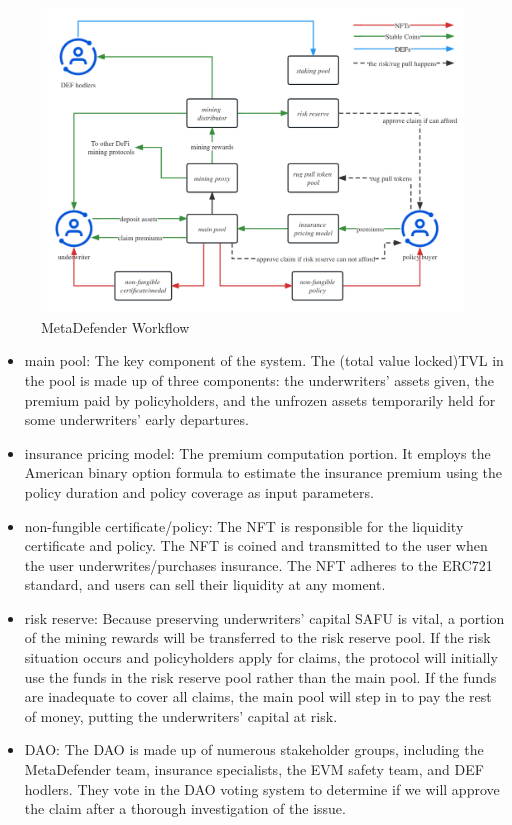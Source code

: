 \documentclass[10pt, a4paper, twocolumn]{article} %
\begin{document}
\begin{figure}[H]
	\includegraphics[width=\linewidth]{workflow_process_on.jpg} %
	\caption{MetaDefender Workflow} %
	\label{workflow} %
\end{figure}

\begin{itemize}
    \item main pool: The key component of the system.
	The (total value locked)TVL in the pool is made up of three components: the underwriters' assets given, the premium paid by policyholders, and the unfrozen assets temporarily held for some underwriters' early departures.
	\item insurance pricing model: The premium computation portion.
	It employs the American binary option formula to estimate the insurance premium using the policy duration and policy coverage as input parameters.
	\item non-fungible certificate/policy: The NFT is responsible for the liquidity certificate and policy.
	The NFT is coined and transmitted to the user when the user underwrites/purchases insurance.
	The NFT adheres to the ERC721 standard, and users can sell their liquidity at any moment.
	\item risk reserve: Because preserving underwriters' capital SAFU is vital, a portion of the mining rewards will be transferred to the risk reserve pool.
	If the risk situation occurs and policyholders apply for claims, the protocol will initially use the funds in the risk reserve pool rather than the main pool.
	If the funds are inadequate to cover all claims, the main pool will step in to pay the rest of money, putting the underwriters' capital at risk.
	\item DAO: The DAO is made up of numerous stakeholder groups, including the MetaDefender team, insurance specialists, the EVM safety team, and DEF hodlers.
	They vote in the DAO voting system to determine if we will approve the claim after a thorough investigation of the issue.
\end{itemize}
\end{document}
